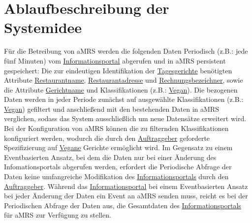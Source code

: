 \section{Ablaufbeschreibung der Systemidee}\label{cha:AblaufbeschreibungderSystemidee}
Für die Betreibung von \ac{aMRS} werden die folgenden Daten Periodisch (z.B.: jede fünf Minuten) vom \hyperref[gls:informationsportal]{Informationsportal} abgerufen und in \ac{aMRS} persistent gespeichert:
Die zur eindeutigen Identifikation der \hyperref[gls:tagesgericht]{Tagesgerichte} benötigten Attribute \hyperref[gls:restaurantname]{Restaurantname}, \hyperref[gls:restaurantAdresse]{Restaurantadresse} und \hyperref[gls:Rechnungsbezeichner]{Rechnungsbezeichner}, sowie die Attribute \hyperref[gls:gerichtname]{Gerichtname} und Klassifikationen (z.B.: \hyperref[gls:vegan]{Vegan}).
Die bezogenen Daten werden in jeder Periode zunächst auf ausgewählte Klassifikationen (z.B.: \hyperref[gls:vegan]{Vegan}) gefiltert und anschließend mit den bestehenden Daten in \ac{aMRS} verglichen, sodass das System ausschließlich um neue Datensätze erweitert wird.
Bei der Konfiguration von \ac{aMRS} können die zu filternden Klassifikationen konfiguriert werden, wodurch die durch den \hyperref[gls:auftraggeber]{Auftraggeber} geforderte Spezifizierung auf \hyperref[gls:vegan]{Vegane} Gerichte ermöglicht wird.
\newparagraph
Im Gegensatz zu einem Eventbasierten Ansatz, bei dem die Daten nur bei einer Änderung des Infomationsportals abgerufen werden, erfordert die Periodische Abfrage der Daten keine umfangreiche Modifikation des \hyperref[gls:informationsportal]{Informationsportals} durch den \hyperref[gls:auftraggeber]{Auftraggeber}.
Während das \hyperref[gls:informationsportal]{Informationsportal} bei einem Eventbasierten Ansatz bei jeder Änderung der Daten ein Event an \ac{aMRS} senden muss, reicht es bei der Periodischen Abfrage der Daten aus, die Gesamtdaten des \hyperref[gls:informationsportal]{Informationsportals} für \ac{aMRS} zur Verfügung zu stellen.
\newparagraph
